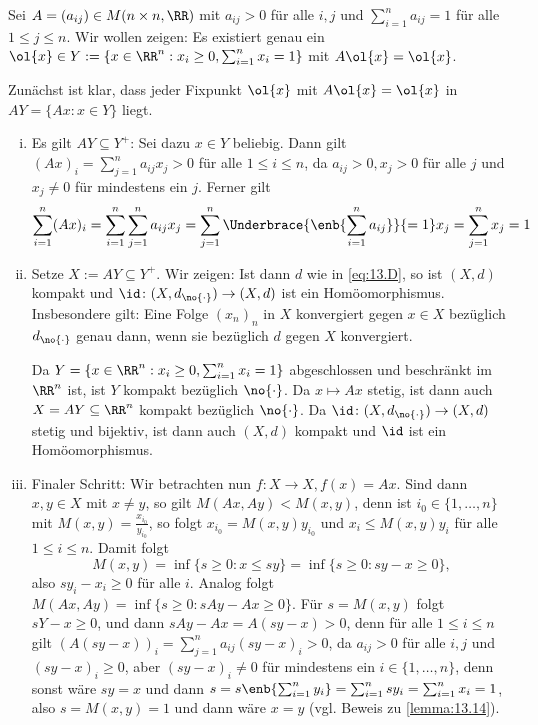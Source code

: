 \begin{beweis}
	Sei $A = (a_{ij}) \in M(n \times n,\RR)$ mit $a_{ij} > 0$ für alle $i,j$ und $\sum_{i=1}^{n} a_{ij} = 1$ für alle $1 \leq j \leq n$.
	Wir wollen zeigen:
	Es existiert genau ein $\ol{x} \in Y := \{x \in \RR^n : x_i \geq 0, \sum_{i=1}^{n} x_i = 1\}$ mit $A\ol{x} = \ol{x}$.
	
	Zunächst ist klar, dass jeder Fixpunkt $\ol{x}$ mit $A\ol{x} = \ol{x}$ in $AY = \{Ax : x \in Y\}$ liegt.
	\begin{enumerate}[(i)]
		\item Es gilt $AY \subseteq Y^+$:
		Sei dazu $x \in Y$ beliebig.
		Dann gilt $(Ax)_i = \sum_{j=1}^{n} a_{ij} x_j > 0$ für alle $1 \leq i \leq n$, da $a_{ij} > 0, x_j > 0$ für alle $j$ und $x_j \neq 0$ für mindestens ein $j$.
		Ferner gilt
		\[
			\sum_{i=1}^{n} (Ax)_i = \sum_{i=1}^{n} \sum_{j=1}^{n} a_{ij} x_j = \sum_{j=1}^{n} \Underbrace{\enb{\sum_{i=1}^{n} a_{ij}}}{=1} x_j = \sum_{j=1}^{n} x_j = 1
		\]
		\item Setze $X := AY \subseteq Y^+$.
		Wir zeigen:
		Ist dann $d$ wie in \eqref{eq:13.D}, so ist $(X,d)$ kompakt und $\id\colon (X,d_{\no{\cdot}}) \rightarrow (X,d)$ ist ein Homöomorphismus. 
		Insbesondere gilt:
		Eine Folge $(x_n)_n$ in $X$ konvergiert gegen $x \in X$ bezüglich $d_{\no{\cdot}}$ genau dann, wenn sie bezüglich $d$ gegen $X$ konvergiert.
		
		Da $Y = \{x \in \RR^n : x_i \geq 0, \sum_{i=1}^{n} x_i = 1\}$ abgeschlossen und beschränkt im $\RR^n$ ist, ist $Y$ kompakt bezüglich $\no{\cdot}$.
		Da $x \mapsto Ax$ stetig, ist dann auch $X = AY \subseteq \RR^n$ kompakt bezüglich $\no{\cdot}$.
		Da $\id\colon (X,d_{\no{\cdot}}) \rightarrow (X,d)$ stetig und bijektiv, ist dann auch $(X,d)$ kompakt und $\id$ ist ein Homöomorphismus.
		\item Finaler Schritt:
		Wir betrachten nun $f \colon X \rightarrow X, f(x) = Ax$.
		Sind dann $x,y \in X$ mit $x \neq y$, so gilt $M(Ax,Ay) < M(x,y)$, denn ist $i_0 \in \{1,\dots,n\}$ mit $M(x,y) = \frac{x_{i_0}}{y_{i_0}}$, so folgt $x_{i_0} = M(x,y) y_{i_0}$ und $x_i \leq M(x,y) y_i$ für alle $1 \leq i \leq n$.
		Damit folgt
		\[
			M(x,y) = \inf \{s \geq 0 : x \leq sy\} = \inf \{s \geq 0 : sy-x \geq 0\},
		\]
		also $sy_i - x_i \geq 0$ für alle $i$.
		Analog folgt $M(Ax,Ay) = \inf\{s \geq 0 : sAy - Ax \geq 0\}$.
		Für $s = M(x,y)$ folgt $sY-x \geq 0$, und dann $sAy - Ax = A(sy-x) > 0$, denn für alle $1 \leq i \leq n$ gilt $(A(sy-x))_i = \sum_{j=1}^{n} a_{ij} (sy-x)_i > 0$, da $a_{ij} > 0$ für alle $i,j$ und $(sy-x)_i \geq 0$, aber $(sy-x)_i \neq 0$ für mindestens ein $i \in \{1,\dots,n\}$, denn sonst wäre $sy = x$ und dann $s = s\enb{\sum_{i=1}^{n} y_i} = \sum_{i=1}^{n} sy_i = \sum_{i=1}^{n} x_i = 1$, also $s = M(x,y) = 1$ und dann wäre $x=y$ (vgl. Beweis zu \autoref{lemma:13.14}).
		

\end{enumerate}
\end{beweis}
